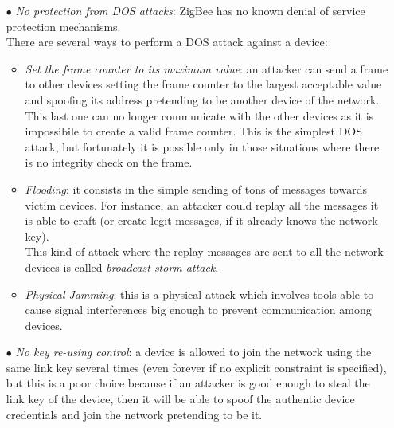 \documentclass[12pt]{report}
\begin{document}
{\begin{itemize}
\item[$\bullet$] \emph{No protection from DOS attacks}: ZigBee has no known denial of service protection mechanisms.\\
There are several ways to perform a DOS attack against a device:


\begin{itemize}
\setlength{\itemindent}{+4mm}
\item \emph{Set the frame counter to its maximum value}: an attacker can send a frame to other devices setting the frame counter to the largest acceptable value and spoofing its address pretending to be another device of the network.\\
This last one can no longer communicate with the other devices as it is impossibile to create a valid frame counter.
This is the simplest DOS attack, but fortunately it is possible only in those situations where there is no integrity check on the frame.

\item \emph{Flooding}: it consists in the simple sending of tons of messages towards victim devices. For instance, an attacker could replay all the messages it is able to craft (or create legit messages, if it already knows the network key).\\
This kind of attack where the replay messages are sent to all the network devices is called \emph{broadcast storm attack}.

\item \emph{Physical Jamming}: this is a physical attack which involves tools able to cause signal interferences big enough to prevent communication among devices.

\end{itemize}

\item[$\bullet$] \emph{No key re-using control}: a device is allowed to join the network using the same link key several times (even forever if no explicit constraint is specified), but this is a poor choice because if an attacker is good enough to steal the link key of the device, then it will be able to spoof the authentic device credentials and join the network pretending to be it.


\end{itemize}}
\end{document}
